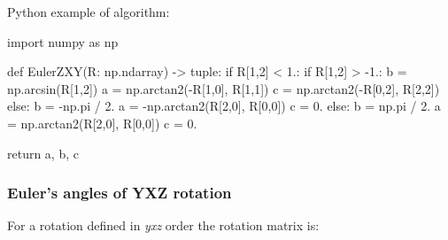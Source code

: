     Python example of algorithm:

\begin{python}
import numpy as np

def EulerZXY(R: np.ndarray) -> tuple:
    if R[1,2] < 1.:
        if R[1,2] > -1.:
            b = np.arcsin(R[1,2])
            a = np.arctan2(-R[1,0], R[1,1])
            c = np.arctan2(-R[0,2], R[2,2])
        else:
            b = -np.pi / 2.
            a = -np.arctan2(R[2,0], R[0,0])
            c = 0.
    else:
        b = np.pi / 2.
        a = np.arctan2(R[2,0], R[0,0])
        c = 0.

    return a, b, c
\end{python}

\subsubsection{Euler's angles of \textbf{YXZ} rotation}

    For a rotation defined in \textit{yxz} order the rotation matrix is:

